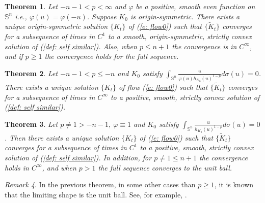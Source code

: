 \documentclass{amsart}
\newtheorem{theorem}{Theorem}
\theoremstyle{definition}
\theoremstyle{remark}
\newtheorem{remark}[theorem]{Remark}
\numberwithin{equation}{section}
\begin{document}
\begin{theorem}
Let $-n-1<p<\infty$ and $\varphi$ be a positive, smooth even function on $\mathbb{S}^{n}$ i.e., $\varphi(u)=\varphi(-u)$. Suppose $K_0$ is origin-symmetric. There exists a unique origin-symmetric solution $\{K_t\}$ of (\ref{e: flow0}) such that $\{\tilde{K}_t\}$ converges for a subsequence of times in $C^{1}$ to a smooth, origin-symmetric, strictly convex solution of (\ref{def: self similar}). Also, when $p\leq n+1$ the convergence is in $C^{\infty}$, and if $p\ge 1$ the convergence holds for the full sequence.
\end{theorem}
\begin{theorem}
Let $-n-1< p\leq -n$ and $K_0$ satisfy $\int_{\mathbb{S}^{n}}\frac{u}{\varphi(u)h_{K_0}(u)^{1-p}}d\sigma(u)=0$. There exists a unique solution $\{K_t\}$ of flow (\ref{e: flow0}) such that $\{\tilde{K}_t\}$ converges for a subsequence of times in $C^{\infty}$ to a positive, smooth, strictly convex solution of (\ref{def: self similar}).
\end{theorem}
\begin{theorem}
Let $p\neq 1>-n-1,~\varphi\equiv 1$ and $K_0$ satisfy $\int_{\mathbb{S}^{n}}\frac{u}{h_{K_0}(u)^{1-p}}d\sigma(u)=0$. Then there exists a unique solution $\{K_t\}$ of (\ref{e: flow0}) such that $\{\tilde{K}_t\}$ converges for a subsequence of times in $C^{1}$ to a positive, smooth, strictly convex solution of (\ref{def: self similar}). In addition, for $p\neq 1\leq n+1$ the convergence holds in $C^{\infty}$, and when $p> 1$ the full sequence converges to the unit ball.
\end{theorem}
\begin{remark}
In the previous theorem, in some other cases than $p\ge 1$, it is known that the limiting shape is the unit ball. See, for example, \cite{Andrews 1999, andrewschen}.
\end{remark}
\end{document}
